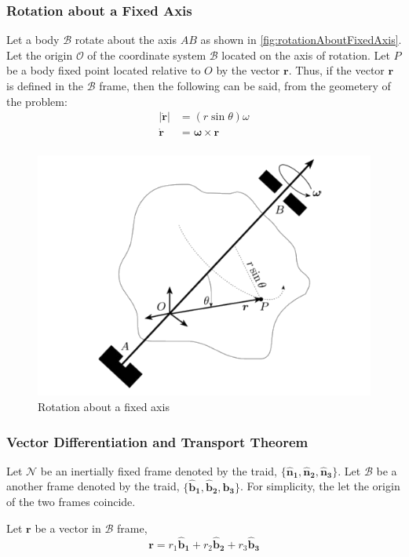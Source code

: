 \subsubsection*{Rotation about a Fixed Axis}
Let a body \(\mathcal{B} \) rotate about the axis \(AB\) as shown in \autoref{fig:rotationAboutFixedAxis}. Let the origin \(\mathcal{O} \) of the coordinate system \(\mathcal{B} \) located on the axis of rotation. Let \(P\) be a body fixed point located relative to \(O\) by the vector \(\bm{r} \). Thus, if the vector \(\bm{r} \) is defined in the \(\mathcal{B} \) frame, then the following can be said, from the geometery of the problem:
\[
	\begin{aligned}
		\vert \bm{\dot{r} }  \vert & = (r \sin \theta)  \omega    \\
		\bm{\dot{r} }              & = \bm{\omega } \times \bm{r} \\
	\end{aligned}
\]
\begin{figure}[H]
	\centering
	\includegraphics[width=0.5\linewidth]{figures/dynamics/rotationAboutFixedAxis.png}
	\caption{Rotation about a fixed axis}
	\label{fig:rotationAboutFixedAxis}
\end{figure}

\subsubsection{Vector Differentiation and Transport Theorem}
\label{subsub_sec:Vector Differentiation}

Let \(\mathcal{N} \) be an inertially fixed frame denoted by the traid, \( \{\bm{{\hat{n}_{1}}}, \bm{{\hat{n}_{2}}}, \bm{{\hat{n}_{3}}}\} \). Let \(\mathcal{B} \) be a another frame denoted by the traid, \( \{\bm{{\hat{b}_{1}}}, \bm{{\hat{b}_{2}}}, \bm{{\hat{b}_{3}}} \}\). For simplicity, the let the origin of the two frames coincide.

Let \(\bm{r}\) be a vector in \(\mathcal{B} \) frame,
\[
	\bm{r} = r_{1}\bm{{\hat{b}_{1}}} + r_{2}\bm{{\hat{b}_{2}}} + r_{3}\bm{{\hat{b}_{3}}}
\]

